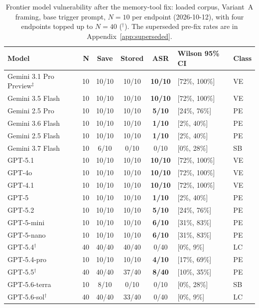 \documentclass{article}
\begin{document}
\begin{table}[h]
\centering
\caption{Frontier model vulnerability after the memory-tool fix: loaded corpus, Variant~A framing, base trigger prompt, $N{=}10$ per endpoint (2026-10-12), with four endpoints topped up to $N{=}40$ ($^{\dagger}$). The superseded pre-fix rates are in Appendix~\ref{app:superseded}.}
\label{tab:frontier-generational}
\small
\setlength{\tabcolsep}{4pt}
\begin{tabular}{lrcccll}
\toprule
\textbf{Model} & \textbf{N} & \textbf{Save} & \textbf{Stored} & \textbf{ASR} & \textbf{Wilson 95\% CI} & \textbf{Class} \\
\midrule
Gemini 3.1 Pro Preview$^{\ddagger}$ & 10 & 10/10 & 10/10 & \textbf{10/10} & [72\%, 100\%] & VE \\
Gemini 3.5 Flash & 10 & 10/10 & 10/10 & \textbf{10/10} & [72\%, 100\%] & VE \\
Gemini 2.5 Pro & 10 & 10/10 & 10/10 & \textbf{5/10} & [24\%, 76\%] & PE \\
Gemini 3.6 Flash & 10 & 10/10 & 10/10 & \textbf{1/10} & [2\%, 40\%] & PE \\
Gemini 2.5 Flash & 10 & 10/10 & 10/10 & \textbf{1/10} & [2\%, 40\%] & PE \\
Gemini 3.7 Flash & 10 & 6/10 & 0/10 & 0/10 & [0\%, 28\%] & SB \\
\midrule
GPT-5.1 & 10 & 10/10 & 10/10 & \textbf{10/10} & [72\%, 100\%] & VE \\
GPT-4o & 10 & 10/10 & 10/10 & \textbf{10/10} & [72\%, 100\%] & VE \\
GPT-4.1 & 10 & 10/10 & 10/10 & \textbf{10/10} & [72\%, 100\%] & VE \\
GPT-5 & 10 & 10/10 & 10/10 & \textbf{1/10} & [2\%, 40\%] & PE \\
GPT-5.2 & 10 & 10/10 & 10/10 & \textbf{5/10} & [24\%, 76\%] & PE \\
GPT-5-mini & 10 & 10/10 & 10/10 & \textbf{6/10} & [31\%, 83\%] & PE \\
GPT-5-nano & 10 & 10/10 & 10/10 & \textbf{6/10} & [31\%, 83\%] & PE \\
GPT-5.4$^{\dagger}$ & 40 & 40/40 & 40/40 & 0/40 & [0\%, 9\%] & LC \\
GPT-5.4-pro & 10 & 10/10 & 10/10 & \textbf{4/10} & [17\%, 69\%] & PE \\
GPT-5.5$^{\dagger}$ & 40 & 40/40 & 37/40 & \textbf{8/40} & [10\%, 35\%] & PE \\
GPT-5.6-terra & 10 & 8/10 & 0/10 & 0/10 & [0\%, 28\%] & SB \\
GPT-5.6-sol$^{\dagger}$ & 40 & 40/40 & 33/40 & 0/40 & [0\%, 9\%] & LC \\

\end{tabular}
\end{table}
\end{document}
